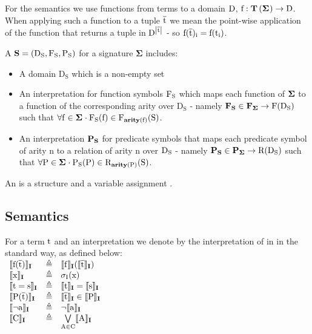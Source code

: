 \noindent
For the semantics we use functions from terms to a domain $\mathrm{D}$, $\function{f} : \Ts{\sig} \rightarrow \term{D}$.
When applying such a function to a tuple $\mathrm{\overline{t}}$ we mean the point-wise application of the function that returns a tuple in
$\mathrm{D}^{\left|\mathrm{\overline{t}}\right|}$ - so $\mathrm{f}(\mathrm{\overline{t}})_{\mathrm{i}} = \mathrm{f}(\mathrm{t}_{\mathrm{i}})$.


\bigskip

\noindent
A  $\mathrm{\mathbf{S}=(D_S,F_S,P_S)}$ for a signature $\mathbf{\Sigma}$ includes:
\begin{itemize}
	\item A domain $\mathrm{D_S}$ which is a non-empty set
	\item An interpretation for function symbols $\mathrm{F_S}$ which maps each function of $\sig{}$ to a function of the corresponding arity over $\mathrm{D_S}$ -
namely $\mathbf{F_S} \in \mathbf{F_{\sig{}}} \rightarrow \mathrm{F(D_S)}$ such that
$\forall \m{f} \in \mathbf{\sig} \cdot \m{F_S}(\m{f}) \in \m{F_{\arity{f}}(S)}$. 
	\item An interpretation $\mathrm{\mathbf{P_S}}$ for predicate symbols that maps each predicate symbol of arity n to a relation of arity n over $\mathrm{D_S}$ - namely $\mathbf{P_S} \in \mathbf{P_{\sig{}}} \rightarrow \mathrm{R(D_S)}$ such that
$\forall \m{P} \in \mathbf{\sig} \cdot \m{P_S}(\m{P}) \in \m{R_{\arity{P}}(S)}$. 
\end{itemize}

\noindent
An   is a structure  and a variable assignment 
.

\subsection*{Semantics}\label{section:preliminaries:semantics}
For a term $\mathrm{t}$ and an interpretation  we denote by  the interpretation of  in  in the standard way, as defined below:\\
$
\begin{array}{lll}
	\llbracket \mathrm{\mathrm{f}(\mathrm{\overline{t}})} \rrbracket_{\mathbf{I}} & \triangleq & \llbracket \mathrm{\mathrm{f}} \rrbracket_{\mathbf{I}}(\llbracket \mathrm{\mathrm{\overline{t}}} \rrbracket_{\mathbf{I}}) \\
	\llbracket \mathrm{x} \rrbracket_{\mathbf{I}} & \triangleq & \mathrm{\sigma_I(x)} \\
	\llbracket \mathrm{t=s} \rrbracket_{\mathbf{I}} & \triangleq & \llbracket \mathrm{t} \rrbracket_{\mathbf{I}}=\llbracket \mathrm{s} \rrbracket_{\mathbf{I}}  \\
	\llbracket \mathrm{\mathrm{P}(\mathrm{\overline{t}})} \rrbracket_{\mathbf{I}} & \triangleq & \mathrm{\llbracket \mathrm{\mathrm{\overline{t}}} \rrbracket_{\mathbf{I}} \in \llbracket \mathrm{P} \rrbracket_{\mathbf{I}}} \\
	\llbracket \mathrm{\lnot a} \rrbracket_{\mathbf{I}} & \triangleq & \lnot \llbracket \mathrm{a} \rrbracket_{\mathbf{I}} \\
	\llbracket \mathrm{C} \rrbracket_{\mathbf{I}} & \triangleq & \mathrm{ \bigvee\limits_{A \in C} \llbracket \mathrm{A} \rrbracket_{\mathbf{I}}} \\
\end{array}
$

